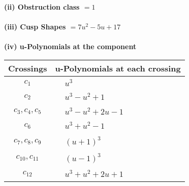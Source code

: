 \documentclass[1p]{elsarticle_modified}
\theoremstyle{definition}
\begin{document}
\flushleft \textbf{(ii) Obstruction class $= 1$}\\~\\
\flushleft \textbf{(iii) Cusp Shapes $= 7 u^2-5 u+17$}\\~\\
\newpage\renewcommand{\arraystretch}{1}
\flushleft \textbf{(iv) u-Polynomials at the component}\newline \\
\begin{tabular}{m{50pt}|m{274pt}}
Crossings & \hspace{64pt}u-Polynomials at each crossing \\
\hline $$\begin{aligned}c_{1}\end{aligned}$$&$\begin{aligned}
&u^3
\end{aligned}$\\
\hline $$\begin{aligned}c_{2}\end{aligned}$$&$\begin{aligned}
&u^3- u^2+1
\end{aligned}$\\
\hline $$\begin{aligned}c_{3},c_{4},c_{5}\end{aligned}$$&$\begin{aligned}
&u^3- u^2+2 u-1
\end{aligned}$\\
\hline $$\begin{aligned}c_{6}\end{aligned}$$&$\begin{aligned}
&u^3+u^2-1
\end{aligned}$\\
\hline $$\begin{aligned}c_{7},c_{8},c_{9}\end{aligned}$$&$\begin{aligned}
&(u+1)^3
\end{aligned}$\\
\hline $$\begin{aligned}c_{10},c_{11}\end{aligned}$$&$\begin{aligned}
&(u-1)^3
\end{aligned}$\\
\hline $$\begin{aligned}c_{12}\end{aligned}$$&$\begin{aligned}
&u^3+u^2+2 u+1
\end{aligned}$\\
\hline
\end{tabular}\\~\\
\end{document}
